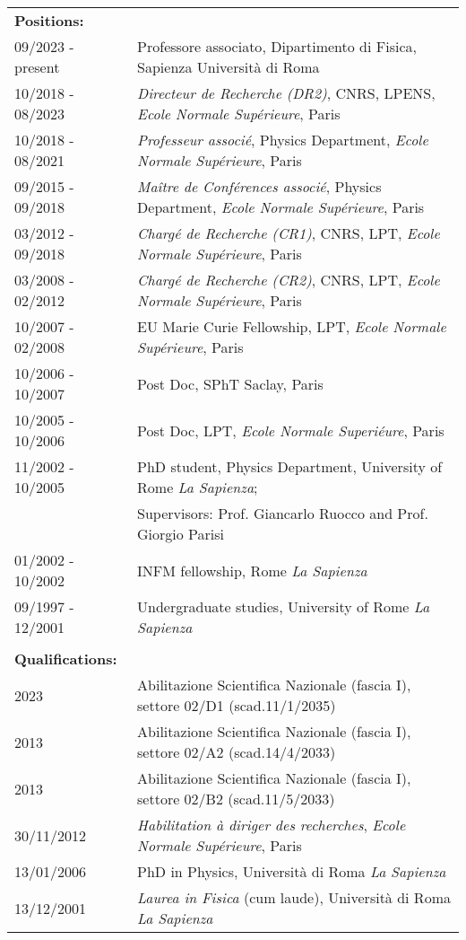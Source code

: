 \documentclass[a4paper,10pt]{article}
\begin{document}
\begin{table}[h]
\begin{tabular}{ll}

{\bf Positions:} & \\
09/2023 - present & {Professore associato}, Dipartimento di Fisica, Sapienza Universit\`a di Roma \\
10/2018 - 08/2023 &  {\it Directeur de Recherche (DR2)}, CNRS, LPENS, {\it Ecole Normale Sup\'erieure}, Paris \\
10/2018 - 08/2021 & {\it Professeur associ\'e}, Physics Department, {\it Ecole Normale Sup\'erieure}, Paris \\
09/2015 - 09/2018 & {\it Ma\^itre de Conf\'erences associ\'e}, Physics Department, {\it Ecole Normale Sup\'erieure}, Paris \\
03/2012 - 09/2018 &  {\it Charg\'e de Recherche (CR1)}, CNRS, LPT, {\it Ecole Normale Sup\'erieure}, Paris \\
03/2008 - 02/2012 & {\it Charg\'e de Recherche (CR2)}, CNRS, LPT, {\it Ecole Normale Sup\'erieure}, Paris \\
10/2007 - 02/2008 & EU Marie Curie Fellowship, LPT, {\it Ecole Normale Sup\'erieure}, Paris \\
10/2006 - 10/2007 & Post Doc, SPhT Saclay, Paris \\
10/2005 - 10/2006  &
Post Doc, LPT, {\it Ecole Normale Superi\'eure}, Paris \\
11/2002 - 10/2005  & 
PhD student, Physics Department, University of Rome {\it La Sapienza}; \\
 & Supervisors: Prof. Giancarlo Ruocco and Prof. Giorgio Parisi \\
01/2002 - 10/2002 & INFM fellowship, Rome {\it La Sapienza} \\
09/1997 - 12/2001 & Undergraduate studies, University of Rome {\it La Sapienza} \\
\\
{\bf Qualifications:} & \\
2023 & Abilitazione Scientifica Nazionale (fascia I), settore 02/D1 (scad.11/1/2035) \\
2013 & Abilitazione Scientifica Nazionale (fascia I), settore 02/A2 (scad.14/4/2033)  \\
2013 & Abilitazione Scientifica Nazionale (fascia I), settore 02/B2 (scad.11/5/2033)  \\
30/11/2012 & {\it Habilitation \`a diriger des recherches}, {\it Ecole Normale Sup\'erieure}, Paris \\
13/01/2006 & PhD in Physics, Universit\`a di Roma {\it La Sapienza} \\
13/12/2001 & {\it Laurea in Fisica} (cum laude), Universit\`a di Roma {\it La Sapienza} \\
\end{tabular}
\end{table}
\end{document}
